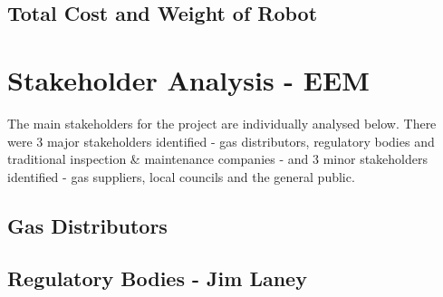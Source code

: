 \documentclass[11pt]{article}		%
\begin{document}
		\subsection{Total Cost and Weight of Robot}
		
	\section{Stakeholder Analysis - EEM}
	
		The main stakeholders for the project are individually analysed below.
		There were 3 major stakeholders identified - gas distributors, regulatory bodies and traditional inspection \& maintenance companies - and 3 minor stakeholders identified - gas suppliers, local councils and the general public.
		
		\subsection[Gas Distributors]{Gas Distributors}
		
		\subsection[Regulatory Bodies]{Regulatory Bodies - Jim Laney}
			
\end{document}
